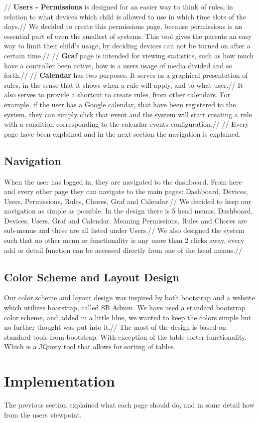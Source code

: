 //
\textbf{Users - Permissions} is designed for an easier way to think of rules, in relation to what devices which child is allowed to use in which time slots of the days.//
We decided to create this permissions page, because permissions is an essential part of even the smallest of systems. This tool gives the parents an easy way to limit their child’s usage, by deciding devices can not be turned on after a certain time.//
//
\textbf{Graf} page is intended for viewing statistics, such as how much have a controller been active, how is a users usage of media divided and so forth.//
//
\textbf{Calendar} has two purposes. It serves as a graphical presentation of rules, in the sense that it shows when a rule will apply, and to what user.//
It also serves to provide a shortcut to create rules, from other calendars. For example, if the user has a Google calendar, that have been registered to the system, they can simply click that event and the system will start creating a rule with a condition corresponding to the calendar events configuration.//
//
Every page have been explained and in the next section the navigation is explained.
\subsection{Navigation}
When the user has logged in, they are navigated to the dashboard. From here and every other page they can navigate to the main pages: Dashboard, Devices, Users, Permissions, Rules, Chores, Graf and Calendar.//
We decided to keep our navigation as simple as possible. In the design there is 5 head menus, Dashboard, Devices, Users, Graf and Calendar. Meaning Permissions, Rules and Chores are sub-menus and these are all listed under Users.//
We also designed the system such that no other menu or functionality is any more than 2 clicks away, every add or detail function can be accessed directly from one of the head menus.//

\subsection{Color Scheme and Layout Design}
Our color scheme and layout design was inspired by both bootstrap and a website which utilizes bootstrap, called SB Admin\citep{sbadmin}. We have used a standard bootstrap color scheme, and added in a little blue, we wanted to keep the colors simple but no further thought was put into it.//
The most of the design is based on standard tools from bootstrap. With exception of the table sorter functionality. Which is a JQuery tool that allows for sorting of tables.


\section{Implementation}
The previous section explained what each page should do, and in some detail how from the users viewpoint.
